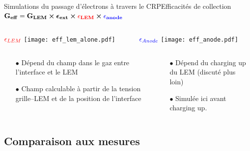     \begin{frame}{Simulations du passage d'électrons à travers le CRP}{Efficacités de collection}
        \hbox{
     		$\mathbf{G_{eff}=G_{LEM}\boldsymbol{\times}\boldsymbol{\epsilon}_{ext} \boldsymbol{\times}\textcolor{red}{\epsilon_{LEM}}\boldsymbol{\times} \textcolor{blue}{\epsilon_{anode}}}$
     	}
   		\begin{columns}
            \begin{column}{0.5\textwidth}
                \centering $\textcolor{red}{\epsilon_{LEM}}$
                \texttt{[image: eff\_lem\_alone.pdf]}
            \end{column}\hfill
            \begin{column}{0.5\textwidth}
                \centering $\textcolor{blue}{\epsilon_{Anode}}$
                \texttt{[image: eff\_anode.pdf]}
            \end{column}
        \end{columns}
   		\begin{columns}
            \begin{column}{0.5\textwidth}
                \begin{itemize}
                    \item[$\bullet$] Dépend du champ dans le gaz entre l'interface et le LEM
                    \item[$\bullet$] Champ calculable à partir de la tension grille--LEM et de la position de l'interface
                \end{itemize}
            \end{column}\hfill
            \begin{column}{0.5\textwidth}
                \begin{itemize}
                    \item[$\bullet$] Dépend du charging up du LEM (discuté plus loin)
                    \item[$\bullet$] Simulée ici avant charging up.
                \end{itemize}
            \end{column}
        \end{columns}
    \end{frame}

    \subsection{Comparaison aux mesures}


